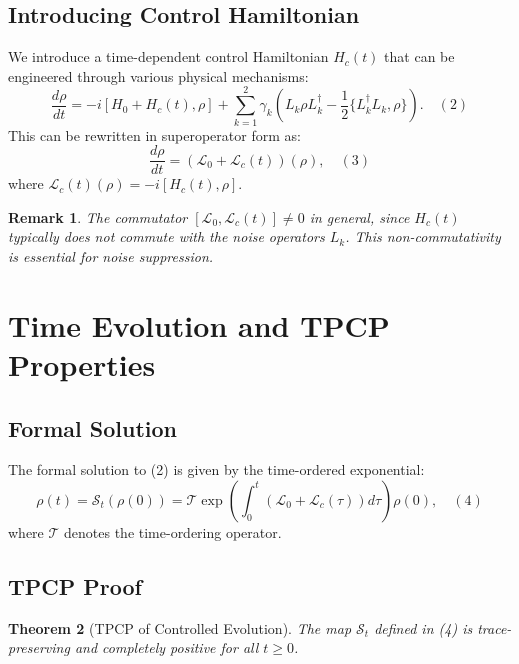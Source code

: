 \documentclass[12pt]{article}
\newtheorem{theorem}{Theorem}[section]
\newtheorem{remark}[theorem]{Remark}
\newcommand{\SJ}{\mathcal{S}}
\newcommand{\Lgen}{\mathcal{L}}
\newcommand{\T}{\mathcal{T}}
\begin{document}
\subsection{Introducing Control Hamiltonian}
We introduce a time-dependent control Hamiltonian $H_{c}(t)$ that can be engineered through various physical mechanisms:
\[
\frac{d\rho}{dt} = -i[H_0 + H_c(t),\rho ] + \sum_{k = 1}^{2}\gamma_k\left(L_k\rho L_k^\dagger -\frac{1}{2}\{L_k^\dagger L_k,\rho \}\right). \quad (2)
\]
This can be rewritten in superoperator form as:
\[
\frac{d\rho}{dt} = (\Lgen_0 + \Lgen_c(t))(\rho), \quad (3)
\]
where $\Lgen_c(t)(\rho) = - i[H_c(t),\rho]$.

\begin{remark}
The commutator $[\Lgen_0, \Lgen_c(t)] \neq 0$ in general, since $H_c(t)$ typically does not commute with the noise operators $L_k$. This non-commutativity is essential for noise suppression.
\end{remark}

\section{Time Evolution and TPCP Properties}
\subsection{Formal Solution}
The formal solution to (2) is given by the time-ordered exponential:
\[
\rho (t) = \SJ_t(\rho (0)) = \T\exp \left(\int_0^t (\Lgen_0 + \Lgen_c(\tau))d\tau\right)\rho (0), \quad (4)
\]
where $\T$ denotes the time-ordering operator.

\subsection{TPCP Proof}
\begin{theorem}[TPCP of Controlled Evolution]
The map $\SJ_t$ defined in (4) is trace-preserving and completely positive for all $t \geq 0$.
\end{theorem}
\end{document}
